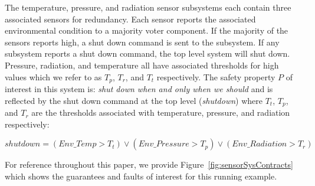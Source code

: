 The temperature, pressure, and radiation sensor subsystems each contain three associated sensors for redundancy. Each sensor reports the associated environmental condition to a majority voter component. If the majority of the sensors reports high, a shut down command is sent to the subsystem. If any subsystem reports a shut down command, the top level system will shut down. Pressure, radiation, and temperature all have associated thresholds for high values which we refer to as $T_p$, $T_r$, and $T_t$ respectively. The safety property $P$ of interest in this system is: \emph{shut down when and only when we should} and is reflected by the shut down command at the top level ({\em shutdown}) where $T_t$, $T_p$, and $T_r$ are the thresholds associated with temperature, pressure, and radiation respectively:

\begin{equation*}
shutdown =  (Env\_Temp > T_t)  \lor  (Env\_Pressure > T_p) \lor (Env\_Radiation > T_r)
\end{equation*}

For reference throughout this paper, we provide Figure~\ref{fig:sensorSysContracts} which shows the guarantees and faults of interest for this running example. 

